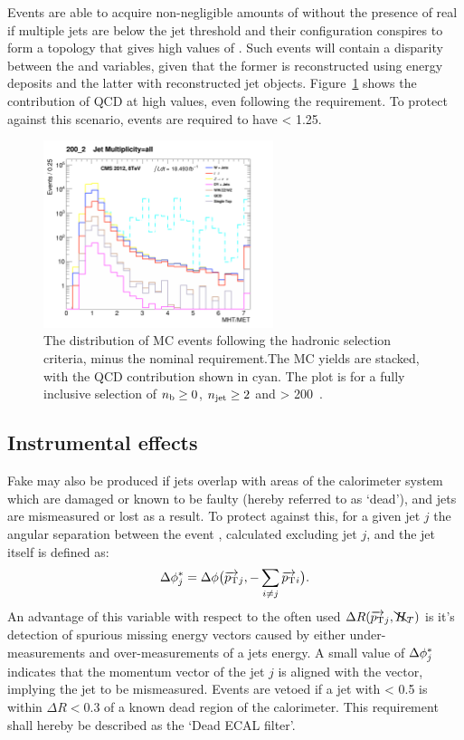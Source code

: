 Events are able to acquire non-negligible amounts of \mht without the presence
of
real \met if multiple jets are below the jet \Pt threshold and their
configuration conspires to form a topology that gives high values of \alphat.
Such events will contain a disparity between the \met and
\mht variables, given that the former is reconstructed using energy deposits
and the latter with reconstructed jet objects.
Figure~\ref{fig:full_mhtmet_distro} shows the contribution of QCD at
high \mhtmet values, even following the \alphat requirement.
To protect against this scenario, events are required to have \mhtmet < 1.25.

\begin{figure}[t]
\centering
\includegraphics[width=0.6\textwidth]
{Figs/datamc/had/v1/Stacked_MHTovMET_all_200_upwards.png}
\caption{The \mhtmet distribution of MC events following the hadronic selection
criteria, minus the nominal \mhtmet requirement.The MC yields are stacked,
with the QCD contribution shown in cyan. The plot is for a fully inclusive
selection of $n_{\text{b}} \geq 0$, $n_{\text{jet}} \geq 2$ and \HT > 200~\gev.}
\label{fig:full_mhtmet_distro}
\end{figure}

\subsection{Instrumental effects}

Fake \mht may also be produced if jets overlap with areas of the calorimeter 
system which are damaged or known to be faulty (hereby referred to as `dead'),
and jets are mismeasured or lost as a result. To protect against this, for a
given jet $j$ the angular separation between the event \mht, calculated
excluding jet $j$, and the jet itself is defined as:
% 
\begin{equation}
\Delta \phi^*_j = \Delta \phi\big(\overrightarrow{{p_{\text T}}}_j,-\sum_{i\neq j}
{\overrightarrow{{p_{\text T}}}_i}\big) .
\label{eq:biasdphi}
\end{equation}
% 
An advantage of this variable with respect to the often used
$\Delta R(\overrightarrow{{p_{\text T}}}_j, \bcancel{H}_T)$ is it's detection of spurious missing
energy vectors
caused
by either under-measurements and over-measurements of a jets energy.
A small value of $\Delta \phi^*_j$ indicates that the momentum vector of the jet $j$
is aligned with the \mht vector, implying the jet to be mismeasured. Events are
vetoed if a jet with \dphistar< 0.5 is within $\Delta R < 0.3$ of a known
dead region of the calorimeter. This requirement shall hereby be described as
the `Dead ECAL filter'.

